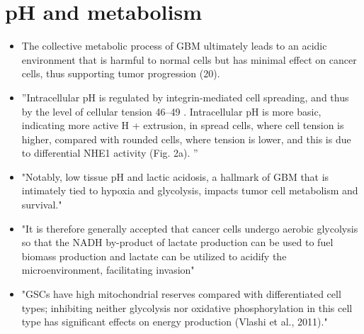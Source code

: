 \documentclass[11pt,a4paper]{article}
\begin{document}
\section{pH and metabolism}
\begin{itemize}
\item The collective metabolic process of GBM ultimately leads to an acidic environment that is harmful to normal cells but has minimal effect on cancer cells, thus supporting tumor progression (20).\cite{Chen2021}
\item ”Intracellular pH is regulated by integrin-mediated cell spreading, and thus by the level of cellular tension 46–49 . Intracellular pH is more basic, indicating more active H
+ extrusion, in spread cells, where cell tension is higher, compared with rounded cells, where tension is lower, and this is due to differential NHE1 activity (Fig. 2a). ”\cite{Romani2020}
\item "Notably, low tissue pH and lactic acidosis, a hallmark of GBM that is intimately tied to hypoxia and glycolysis, impacts tumor cell metabolism and survival."\cite{Chen2021}
\item "It is therefore generally accepted that cancer cells undergo aerobic glycolysis so that the NADH by-product of lactate production can be used to fuel biomass production and lactate can be utilized to acidify the microenvironment, facilitating invasion" \cite{Strickland2017}
\item "GSCs have high mitochondrial reserves compared with differentiated cell types; inhibiting neither glycolysis nor oxidative phosphorylation in this cell type has significant effects on energy production (Vlashi et al., 2011)."\cite{Strickland2017}
\end{itemize}
\end{document}
